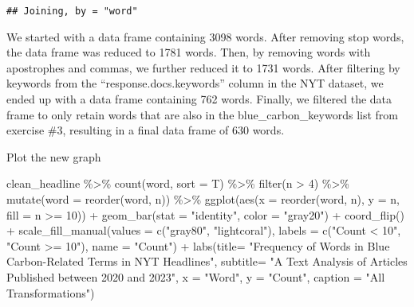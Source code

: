 \documentclass[
]{article}
\newenvironment{Shaded}{\begin{snugshade}}{\end{snugshade}}
\newcommand{\AttributeTok}[1]{\textcolor[rgb]{0.77,0.63,0.00}{#1}}
\newcommand{\DecValTok}[1]{\textcolor[rgb]{0.00,0.00,0.81}{#1}}
\newcommand{\FunctionTok}[1]{\textcolor[rgb]{0.00,0.00,0.00}{#1}}
\newcommand{\NormalTok}[1]{#1}
\newcommand{\SpecialCharTok}[1]{\textcolor[rgb]{0.00,0.00,0.00}{#1}}
\newcommand{\StringTok}[1]{\textcolor[rgb]{0.31,0.60,0.02}{#1}}
\begin{document}
\begin{verbatim}
## Joining, by = "word"
\end{verbatim}

We started with a data frame containing 3098 words. After removing stop
words, the data frame was reduced to 1781 words. Then, by removing words
with apostrophes and commas, we further reduced it to 1731 words. After
filtering by keywords from the ``response.docs.keywords'' column in the
NYT dataset, we ended up with a data frame containing 762 words.
Finally, we filtered the data frame to only retain words that are also
in the blue\_carbon\_keywords list from exercise \#3, resulting in a
final data frame of 630 words.

Plot the new graph

\begin{Shaded}
\begin{Highlighting}[]
\NormalTok{clean\_headline }\SpecialCharTok{\%\textgreater{}\%}
  \FunctionTok{count}\NormalTok{(word, }\AttributeTok{sort =}\NormalTok{ T) }\SpecialCharTok{\%\textgreater{}\%}
  \FunctionTok{filter}\NormalTok{(n }\SpecialCharTok{\textgreater{}} \DecValTok{4}\NormalTok{) }\SpecialCharTok{\%\textgreater{}\%}
  \FunctionTok{mutate}\NormalTok{(}\AttributeTok{word =} \FunctionTok{reorder}\NormalTok{(word, n)) }\SpecialCharTok{\%\textgreater{}\%}
  \FunctionTok{ggplot}\NormalTok{(}\FunctionTok{aes}\NormalTok{(}\AttributeTok{x =} \FunctionTok{reorder}\NormalTok{(word, n), }\AttributeTok{y =}\NormalTok{ n, }\AttributeTok{fill =}\NormalTok{ n }\SpecialCharTok{\textgreater{}=} \DecValTok{10}\NormalTok{)) }\SpecialCharTok{+}
  \FunctionTok{geom\_bar}\NormalTok{(}\AttributeTok{stat =} \StringTok{"identity"}\NormalTok{, }\AttributeTok{color =} \StringTok{"gray20"}\NormalTok{) }\SpecialCharTok{+}
  \FunctionTok{coord\_flip}\NormalTok{() }\SpecialCharTok{+}
  \FunctionTok{scale\_fill\_manual}\NormalTok{(}\AttributeTok{values =} \FunctionTok{c}\NormalTok{(}\StringTok{"gray80"}\NormalTok{, }\StringTok{"lightcoral"}\NormalTok{), }
                    \AttributeTok{labels =} \FunctionTok{c}\NormalTok{(}\StringTok{"Count \textless{} 10"}\NormalTok{, }\StringTok{"Count \textgreater{}= 10"}\NormalTok{), }
                    \AttributeTok{name =} \StringTok{"Count"}\NormalTok{)  }\SpecialCharTok{+}
  \FunctionTok{labs}\NormalTok{(}\AttributeTok{title=} \StringTok{"Frequency of Words in Blue Carbon{-}Related Terms in NYT Headlines"}\NormalTok{,}
       \AttributeTok{subtitle=} \StringTok{"A Text Analysis of Articles Published between 2020 and 2023"}\NormalTok{,}
       \AttributeTok{x =} \StringTok{"Word"}\NormalTok{,}
       \AttributeTok{y =} \StringTok{"Count"}\NormalTok{,}
       \AttributeTok{caption =} \StringTok{"All Transformations"}\NormalTok{)}
\end{Highlighting}
\end{Shaded}
\end{document}
